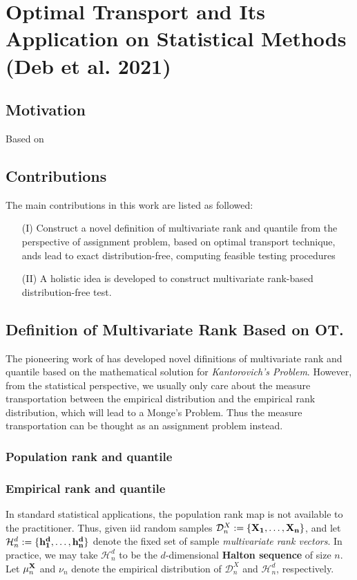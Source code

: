 \chapter{Optimal Transport and Its Application on Statistical Methods (Deb et al. 2021)}
\section{Motivation}
Based on \cite{chernozhukov2017monge}
\section{Contributions}
The main contributions in this work are listed as followed:
\begin{enumerate}
	\item[(I)] Construct a novel definition of multivariate rank and quantile from the perspective of assignment problem, based on optimal transport technique, ands lead to exact distribution-free, computing feasible testing procedures
	\item[(II)] A holistic idea is developed to construct multivariate rank-based distribution-free test.
\end{enumerate}

\section{Definition of Multivariate Rank Based on OT.}

The pioneering work of \cite{chernozhukov2017monge} has developed novel difinitions of multivariate rank and quantile based on the mathematical solution for \textit{Kantorovich's Problem}. However, from the statistical perspective, we usually only care about the measure transportation between the empirical distribution and the empirical rank distribution, which will lead to a Monge's Problem. Thus the measure transportation can be thought as an assignment problem instead. 

\subsection{Population rank and quantile}

\subsection{Empirical rank and quantile}
In standard statistical applications, the population rank map is not available to the practitioner. Thus, given iid random samples $\mathcal{D}_n^X :=\{\bf{X}_1, \dots, \bf{X}_n\}$, and let $ \mathcal{H}_n^d:=\{\bf{h}_1^d, \dots, \bf{h}_n^d\}$ denote the fixed set of sample \textit{multivariate rank vectors}. In practice, we may take $\mathcal{H}_n^d$ to be the $d$-dimensional {\bf Halton sequence} of size $n$. Let $\mu_n^{\bf{X}}$ and $\nu_n$ denote the empirical distribution of $\mathcal{D}_n^X$ and $\mathcal{H}_n^d$, respectively. 

